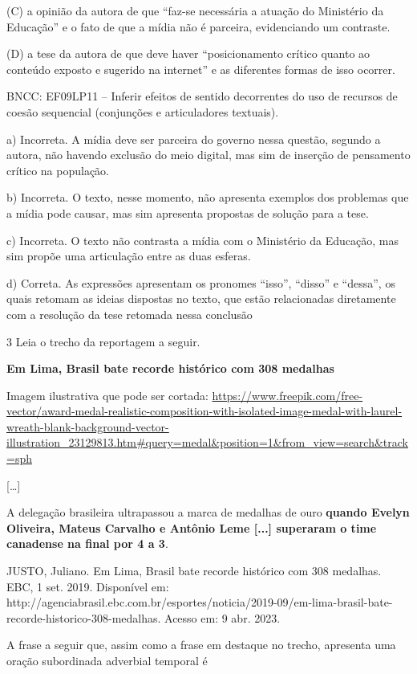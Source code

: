 \begin{itemize}
\begin{itemize}
(C) a opinião da autora de que ``faz-se necessária a atuação do
Ministério da Educação'' e o fato de que a mídia não é parceira,
evidenciando um contraste.

(D) a tese da autora de que deve haver ``posicionamento crítico quanto
ao conteúdo exposto e sugerido na internet'' e as diferentes formas de
isso ocorrer.

BNCC: EF09LP11 -- Inferir efeitos de sentido decorrentes do uso de
recursos de coesão sequencial (conjunções e articuladores textuais).

a) Incorreta. A mídia deve ser parceira do governo nessa questão,
segundo a autora, não havendo exclusão do meio digital, mas sim de
inserção de pensamento crítico na população.

b) Incorreta. O texto, nesse momento, não apresenta exemplos dos
problemas que a mídia pode causar, mas sim apresenta propostas de
solução para a tese.

c) Incorreta. O texto não contrasta a mídia com o Ministério da
Educação, mas sim propõe uma articulação entre as duas esferas.

d) Correta. As expressões apresentam os pronomes ``isso'', ``disso'' e
``dessa'', os quais retomam as ideias dispostas no texto, que estão
relacionadas diretamente com a resolução da tese retomada nessa
conclusão

\num{3} Leia o trecho da reportagem a seguir.

\textbf{Em Lima, Brasil bate recorde histórico com 308 medalhas}

Imagem ilustrativa que pode ser cortada:
\url{https://www.freepik.com/free-vector/award-medal-realistic-composition-with-isolated-image-medal-with-laurel-wreath-blank-background-vector-illustration_23129813.htm\#query=medal\&position=1\&from_view=search\&track=sph}

{[}\ldots{}{]}

A delegação brasileira ultrapassou a marca de medalhas de ouro
\textbf{quando Evelyn Oliveira, Mateus Carvalho e Antônio Leme {[}...{]}
superaram o time canadense na final por 4 a 3}.

JUSTO, Juliano. Em Lima, Brasil bate recorde histórico com 308 medalhas.
EBC, 1 set. 2019. Disponível em:
http://agenciabrasil.ebc.com.br/esportes/noticia/2019-09/em-lima-brasil-bate-recorde-historico-308-medalhas.
Acesso em: 9 abr. 2023.

A frase a seguir que, assim como a frase em destaque no trecho,
apresenta uma oração subordinada adverbial temporal é


\end{itemize}
\end{itemize}
